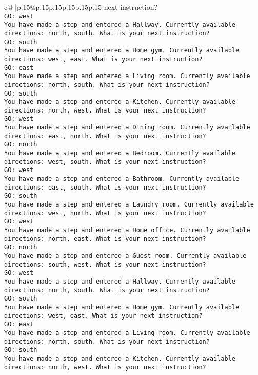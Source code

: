 \documentclass{article}
\begin{document}
{\begin{supertabular}{c@{$\;$}|p{.15\linewidth}@{}p{.15\linewidth}p{.15\linewidth}p{.15\linewidth}p{.15\linewidth}p{.15\linewidth}}
{{{next instruction?\\ \tt GO: west\\ \tt You have made a step and entered a Hallway. Currently available directions: north, south. What is your next instruction?\\ \tt GO: south\\ \tt You have made a step and entered a Home gym. Currently available directions: west, east. What is your next instruction?\\ \tt GO: east\\ \tt You have made a step and entered a Living room. Currently available directions: north, south. What is your next instruction?\\ \tt GO: south\\ \tt You have made a step and entered a Kitchen. Currently available directions: north, west. What is your next instruction?\\ \tt GO: west\\ \tt You have made a step and entered a Dining room. Currently available directions: east, north. What is your next instruction?\\ \tt GO: north\\ \tt You have made a step and entered a Bedroom. Currently available directions: west, south. What is your next instruction?\\ \tt GO: west\\ \tt You have made a step and entered a Bathroom. Currently available directions: east, south. What is your next instruction?\\ \tt GO: south\\ \tt You have made a step and entered a Laundry room. Currently available directions: west, north. What is your next instruction?\\ \tt GO: west\\ \tt You have made a step and entered a Home office. Currently available directions: north, east. What is your next instruction?\\ \tt GO: north\\ \tt You have made a step and entered a Guest room. Currently available directions: south, west. What is your next instruction?\\ \tt GO: west\\ \tt You have made a step and entered a Hallway. Currently available directions: north, south. What is your next instruction?\\ \tt GO: south\\ \tt You have made a step and entered a Home gym. Currently available directions: west, east. What is your next instruction?\\ \tt GO: east\\ \tt You have made a step and entered a Living room. Currently available directions: north, south. What is your next instruction?\\ \tt GO: south\\ \tt You have made a step and entered a Kitchen. Currently available directions: north, west. What is your next instruction?\\ \tt }}}
\end{supertabular}}
\end{document}
